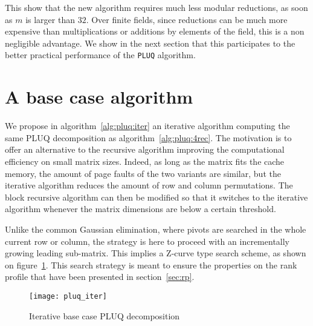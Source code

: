 \documentclass{article}
\newcommand{\pluq}{\texttt{PLUQ}\xspace}
\begin{document}
This show that the new algorithm requires much less modular reductions, as soon
as $m$ is larger than $32$. Over finite fields, since reductions can be much
more expensive than multiplications or additions by elements of the field, this
is a non negligible advantage. We show in the next section that this
participates to the better practical performance of the \pluq algorithm.
 \section{A base case  algorithm}\label{sec:base}

We propose in algorithm~\ref{alg:pluq:iter} an iterative algorithm computing the same PLUQ decomposition as
algorithm~\ref{alg:pluq:4rec}. 
The motivation is to offer an alternative to the recursive algorithm 
improving the computational efficiency on small matrix sizes. 
Indeed, as long as the matrix fits the cache memory, the amount of
page faults of the two variants are similar, but the iterative
algorithm reduces the amount of row and column permutations.
The block recursive algorithm can then be modified so that it switches to the
iterative algorithm whenever the matrix dimensions are below a certain
threshold.

Unlike the common Gaussian elimination, where pivots are searched in the whole
current row or column, the strategy is here to proceed with an incrementally growing
leading sub-matrix. This implies a Z-curve type search scheme, as shown on
figure~\ref{fig:iter}.
This search strategy is meant to ensure the properties on the rank profile that
have been presented in section~\ref{sec:rp}.
\begin{figure}[h]
\begin{center}
  \texttt{[image: pluq\_iter]}
\end{center}
  \caption{Iterative base case PLUQ decomposition}
\label{fig:iter}  
\end{figure}
\end{document}
